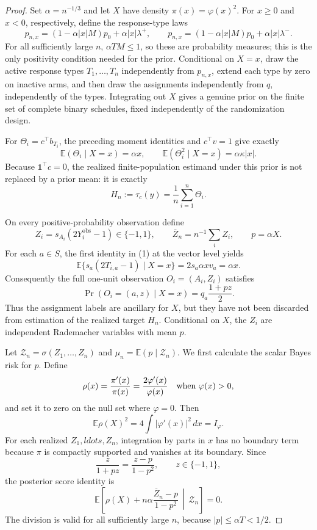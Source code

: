 \documentclass{article}
\begin{document}
{\begin{proof}
Set \(\alpha=n^{-1/3}\) and let \(X\) have density
\(\pi(x)=\varphi(x)^2\).  For \(x\ge0\) and \(x<0\), respectively, define the response-type laws
\[
p_{n,x}=(1-\alpha|x|M)p_0+\alpha|x|\lambda^+,
\qquad
p_{n,x}=(1-\alpha|x|M)p_0+\alpha|x|\lambda^-.
\]
For all sufficiently large \(n\), \(\alpha TM\le1\), so these are probability measures; this is the only positivity condition needed for the prior.  Conditional on \(X=x\), draw the active response types \(T_1,\ldots,T_n\) independently from \(p_{n,x}\), extend each type by zero on inactive arms, and then draw the assignments independently from \(q\), independently of the types.  Integrating out \(X\) gives a genuine prior on the finite set of complete binary schedules, fixed independently of the randomization design.

For \(\Theta_i=c^\top b_{T_i}\), the preceding moment identities and \(c^\top v=1\) give exactly
\[
\mathbb E(\Theta_i\mid X=x)=\alpha x,
\qquad
\mathbb E(\Theta_i^2\mid X=x)=\alpha\kappa|x|.
\tag{1}
\]
Because \(\mathbf1^\top c=0\), the realized finite-population estimand under this prior is not replaced by a prior mean: it is exactly
\[
H_n:=\tau_c(y)=\frac1n\sum_{i=1}^n\Theta_i.
\tag{2}
\]

On every positive-probability observation define
\[
Z_i=s_{A_i}(2Y_i^{\mathrm{obs}}-1)\in\{-1,1\},
\qquad \overline Z_n=n^{-1}\sum_iZ_i,
\qquad p=\alpha X.
\]
For each \(a\in S\), the first identity in (1) at the vector level yields
\[
\mathbb E\{s_a(2T_{i,a}-1)\mid X=x\}
=2s_a\alpha x v_a=\alpha x.
\]
Consequently the full one-unit observation \(O_i=(A_i,Z_i)\) satisfies
\[
\Pr(O_i=(a,z)\mid X=x)=q_a\frac{1+pz}{2}.
\tag{3}
\]
Thus the assignment labels are ancillary for \(X\), but they have not been discarded from estimation of the realized target \(H_n\).  Conditional on \(X\), the \(Z_i\) are independent Rademacher variables with mean \(p\).

Let \(\mathscr Z_n=\sigma(Z_1,\ldots,Z_n)\) and
\(\mu_n=\mathbb E(p\mid\mathscr Z_n)\).  We first calculate the scalar Bayes risk for \(p\).  Define
\[
\rho(x)=\frac{\pi'(x)}{\pi(x)}=\frac{2\varphi'(x)}{\varphi(x)}
\quad\hbox{when }\varphi(x)>0,
\]
and set it to zero on the null set where \(\varphi=0\).  Then
\[
\mathbb E\rho(X)^2=4\int|\varphi'(x)|^2\,dx=I_\varphi.
\tag{4}
\]
For each realized \(Z_1,ldots,Z_n\), integration by parts in \(x\) has no boundary term because \(\pi\) is compactly supported and vanishes at its boundary.  Since
\[
\frac{z}{1+pz}=\frac{z-p}{1-p^2},\qquad z\in\{-1,1\},
\]
the posterior score identity is
\[
\mathbb E\!\left[
\rho(X)+n\alpha\frac{\overline Z_n-p}{1-p^2}
\,\middle|\,\mathscr Z_n\right]=0.
\tag{5}
\]
The division is valid for all sufficiently large \(n\), because
\(|p|\le\alpha T<1/2\).


\end{proof}}
\end{document}
